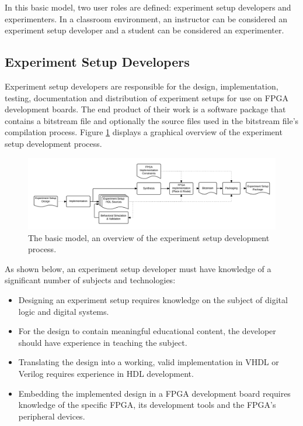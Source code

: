\documentclass[openright]{uva-bachelor-thesis}
\begin{document}
In this basic model, two user roles are defined: experiment setup developers and experimenters. In a classroom environment, an instructor can be considered an experiment setup developer and a student can be considered an experimenter. 

\subsection{Experiment Setup Developers}
\label{sectionexperimentdevelopers}
Experiment setup developers are responsible for the design, implementation, testing, documentation and distribution of experiment setups for use on FPGA development boards. The end product of their work is a software package that contains a bitstream file and optionally the source files used in the bitstream file's compilation process. Figure \ref{fig:process-development-basic} displays a graphical overview of the experiment setup development process. 

\begin{figure}[h]
    \centering
    \includegraphics[width=\textwidth]{processes-basic-development}
    \caption{The basic model, an overview of the experiment setup development process.}
    \label{fig:process-development-basic}
\end{figure}

As shown below, an experiment setup developer must have knowledge of a significant number of subjects and technologies: 

\begin{itemize}
\item Designing an experiment setup requires knowledge on the subject of digital logic and digital systems. 
\item For the design to contain meaningful educational content, the developer should have experience in teaching the subject. 
\item Translating the design into a working, valid implementation in VHDL or Verilog requires experience in HDL development.
\item Embedding the implemented design in a FPGA development board requires knowledge of the specific FPGA, its development tools and the FPGA's peripheral devices.
\end{itemize}
\end{document}
